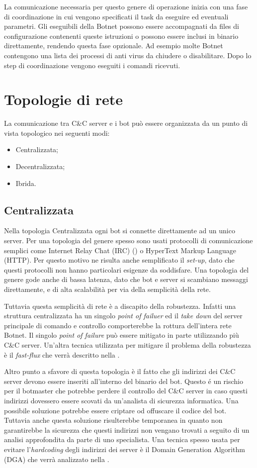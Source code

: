 La comunicazione necessaria per questo genere di operazione inizia con una fase di coordinazione in cui vengono specificati il task da eseguire ed eventuali parametri. Gli eseguibili della Botnet possono essere accompagnati da files di configurazione contenenti queste istruzioni o possono essere inclusi in binario direttamente, rendendo questa fase opzionale. Ad esempio molte Botnet contengono una lista dei processi di anti virus da chiudere o disabilitare. Dopo lo step di coordinazione vengono eseguiti i comandi ricevuti.
\section{Topologie di rete}
La comunicazione tra C\&C server e i bot può essere organizzata da un punto di vista topologico nei seguenti modi:
\begin{itemize}
    \item Centralizzata;
    \item Decentralizzata;
    \item Ibrida.
\end{itemize}

\subsection{Centralizzata}
Nella topologia Centralizzata ogni bot si connette direttamente ad un unico server.
Per una topologia del genere spesso sono usati protocolli di comunicazione semplici come Internet Relay Chat (IRC) () o HyperText Markup Language (HTTP). Per questo motivo ne risulta anche semplificato il \textit{set-up}, dato che questi protocolli non hanno particolari esigenze da soddisfare. 
Una topologia del genere gode anche di bassa latenza, dato che bot e server si scambiano messaggi direttamente, e di alta scalabilità per via della semplicità della rete. 

Tuttavia questa semplicità di rete è a discapito della robustezza. Infatti una struttura centralizzata ha un singolo \textit{point of failuer} ed il \textit{take down} del server principale di comando e controllo comporterebbe la rottura dell'intera rete Botnet. 
Il singolo \textit{point of failure} può essere mitigato in parte utilizzando più C\&C server.
Un'altra tecnica utilizzata per mitigare il problema della robustezza è il \emph{fast-flux} che verrà descritto nella .

Altro punto a sfavore di questa topologia è il fatto che gli indirizzi dei C\&C server devono essere inseriti all'interno del binario del bot. Questo é un rischio per il botmaster che potrebbe perdere il controllo del C\&C server in caso questi indirizzi dovessero essere scovati da un'analista di sicurezza informatica.
Una possibile soluzione potrebbe essere criptare od offuscare il codice del bot. Tuttavia anche questa soluzione risulterebbe temporanea in quanto non garantirebbe la sicurezza che questi indirizzi non vengano trovati a seguito di un analisi approfondita da parte di uno specialista.
Una tecnica spesso usata per evitare l'\textit{hardcoding} degli indirizzi dei server è il Domain Generation Algorithm (DGA) che verrà analizzato nella .

